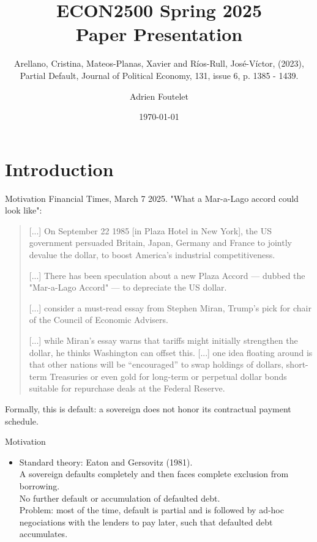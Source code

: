 \documentclass{beamer}
\title{ECON2500 Spring 2025\\ Paper Presentation}
\subtitle{Arellano, Cristina, Mateos-Planas, Xavier and Ríos-Rull, José-Víctor, (2023), Partial Default, Journal of Political Economy, 131, issue 6, p. 1385 - 1439.}
\author{Adrien Foutelet}
\date{\today}
\begin{document}
%
\maketitle
%
\section{Introduction}


\begin{frame}{Motivation}
Financial Times, March 7 2025. "What a Mar-a-Lago accord could look like":
    
\begin{quote}

    \small

    [...] On September 22 1985 [in Plaza Hotel in New York], the US government persuaded Britain, Japan, Germany and France to jointly devalue the dollar, to boost America's industrial competitiveness.

    [...] There has been speculation about a new Plaza Accord — dubbed the "Mar-a-Lago Accord" — to depreciate the US dollar.

    [...] consider a must-read essay from Stephen Miran, Trump's pick for chair of the Council of Economic Advisers.

	[...] while Miran's essay warns that tariffs might initially strengthen the dollar, he thinks Washington can offset this. [...] one idea floating around is that other nations will be “encouraged” to swap holdings of dollars, short-term Treasuries or even gold for long-term or perpetual dollar bonds suitable for repurchase deals at the Federal Reserve.

\end{quote}

Formally, this is default: a sovereign does not honor its contractual payment schedule.
    
\end{frame}

\begin{frame}{Motivation}

\begin{itemize}
    \item Standard theory: Eaton and Gersovitz (1981).
    \\ \bigskip
    A sovereign defaults completely and then faces complete exclusion from borrowing.
    \\ \bigskip    
    No further default or accumulation of defaulted debt.
    \\ \bigskip
    Problem: most of the time, default is partial and is followed by ad-hoc negociations with the lenders to pay later, such that defaulted debt accumulates.
    \\ \bigskip
\end{itemize}

\end{frame}
\end{document}
